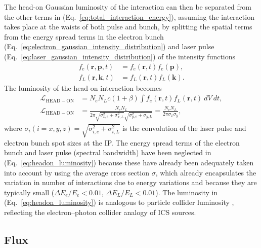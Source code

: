 \documentclass[../main.tex]{subfiles}
\begin{document}
The head-on Gaussian luminosity of the interaction can then be separated from the other terms in (Eq.~\ref{eq:total_interaction_energy}), assuming the interaction takes place at the waists of both pulse and bunch, by splitting the spatial terms from the energy spread terms in the electron bunch (Eq.~\ref{eq:electron_gaussian_intensity_distribution}) and laser pulse (Eq.~\ref{eq:laser_gaussian_intensity_distribution}) of the intensity functions
\begin{align}
f_{e}\left(\boldsymbol{r},\boldsymbol{p},t\right) &= f_{e}\left(\boldsymbol{r},t\right)f_{e}\left(\boldsymbol{p}\right), \\  
f_{L}\left(\boldsymbol{r},\boldsymbol{k},t\right) &= f_{L}\left(\boldsymbol{r},t\right)f_{L}\left(\boldsymbol{k}\right).
\label{eq:spartial_energy_term_split}
\end{align}
The luminosity of the head-on interaction becomes
\begin{align}
\mathcal{L}_{\mathrm{HEAD-ON}} &= N_{e}N_{L}c\left(1+\beta\right)\int f_{e}\left(\boldsymbol{r},t\right)f_{L}\left(\boldsymbol{r},t\right)~dV~dt, \\
\mathcal{L}_{\mathrm{HEAD-ON}} &= \frac{N_{e}N_{L}}{2\pi\sqrt{\sigma_{x,e}^{2}+\sigma_{x,L}^{2}}\sqrt{\sigma_{y,e}^{2}+\sigma_{y,L}}} = \frac{N_{e}N_{L}}{2\pi\sigma_{x}\sigma_{y}},
\label{eq:headon_luminosity}
\end{align}
where $\sigma_{i}(i=x,y,z) = \sqrt{\sigma_{i,e}^{2}+\sigma_{i,L}^{2}}$ is the convolution of the laser pulse and electron bunch spot sizes at the IP. The energy spread terms of the electron bunch and laser pulse (spectral bandwidth) have been neglected in (Eq.~\ref{eq:headon_luminosity}) because these have already been adequately taken into account by using the average cross section $\sigma$, which already encapsulates the variation in number of interactions due to energy variations and because they are typically small ($\Delta E_{e}/E_{e} < 0.01$, $\Delta E_{L}/E_{L} < 0.01$). The luminosity in (Eq.~\ref{eq:headon_luminosity}) is analogous to particle collider luminosity \cite{herr2006concept,miyahara2008luminosity}, reflecting the electron--photon collider analogy of ICS sources.

\subsection{Flux}
\end{document}
